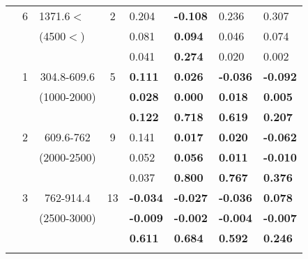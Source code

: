 \begin{table}[p]
\begin{tabular}{ccccllll}
 \multicolumn{1}{c}{} &  \multicolumn{1}{c}{6} &  \multicolumn{1}{l}{1371.6$<$} &  \multicolumn{1}{c}{2} & 0.204 & \textbf{-0.108 } & 0.236  & 0.307  \\ 
 \multicolumn{1}{c}{} &  \multicolumn{1}{c}{} &  \multicolumn{1}{l}{(4500$<$)} &  \multicolumn{1}{c}{} & 0.081 &  \textbf{0.094 } & 0.046  & 0.074  \\ 
 \multicolumn{1}{c}{} &  \multicolumn{1}{c}{} &  \multicolumn{1}{c}{} &  \multicolumn{1}{c}{} & 0.041 & \textbf{0.274 } & 0.020  & 0.002  \\ \hline\noalign{\smallskip}
 \multicolumn{1}{c}{2009-2012} &  \multicolumn{1}{c}{1} &  \multicolumn{1}{p{2cm}}{304.8-609.6} &  \multicolumn{1}{c}{5} & \textbf{0.111} &  \textbf{0.026 } & \textbf{-0.036 } & \textbf{-0.092 }  \\ 
  \multicolumn{1}{c}{} &  \multicolumn{1}{c}{} &  \multicolumn{1}{p{2cm}}{ (1000-2000)} &  \multicolumn{1}{c}{} & \textbf{0.028} & \textbf{0.000 } & \textbf{0.018 } & \textbf{0.005 }  \\ 
 \multicolumn{1}{c}{} &  \multicolumn{1}{c}{} &  \multicolumn{1}{c}{} &  \multicolumn{1}{c}{} & \textbf{0.122} & \textbf{0.718 } & \textbf{0.619 } & \textbf{0.207 }  \\ \cline{5-8}\noalign{\smallskip}
 \multicolumn{1}{c}{} &  \multicolumn{1}{c}{2} &  \multicolumn{1}{p{2cm}}{609.6-762} &  \multicolumn{1}{c}{9} & 0.141 & \textbf{0.017 } & \textbf{0.020 } & \textbf{-0.062 }  \\ 
 \multicolumn{1}{c}{} &  \multicolumn{1}{c}{} &  \multicolumn{1}{p{2cm}}{(2000-2500)} &  \multicolumn{1}{c}{} & 0.052 & \textbf{0.056 } & \textbf{0.011 } & \textbf{-0.010 }  \\ 
 \multicolumn{1}{c}{} &  \multicolumn{1}{c}{} &  \multicolumn{1}{c}{} &  \multicolumn{1}{c}{} & 0.037 & \textbf{0.800 } & \textbf{0.767 } & \textbf{0.376 }  \\ \cline{5-8}\noalign{\smallskip}
 \multicolumn{1}{c}{} &  \multicolumn{1}{c}{3} &  \multicolumn{1}{p{2cm}}{762-914.4} &  \multicolumn{1}{c}{13} & \textbf{-0.034 }&  \textbf{-0.027 } & \textbf{-0.036 } & \textbf{0.078 }  \\ 
 \multicolumn{1}{c}{} &  \multicolumn{1}{c}{} &  \multicolumn{1}{p{2cm}}{(2500-3000)} &  \multicolumn{1}{c}{} &\textbf{-0.009}&\textbf{-0.002 } & \textbf{-0.004 } & \textbf{-0.007 }  \\ 
 \multicolumn{1}{c}{} &  \multicolumn{1}{c}{} &  \multicolumn{1}{c}{} &  \multicolumn{1}{c}{} &\textbf{0.611}&\textbf{0.684 } & \textbf{0.592 } & \textbf{0.246 }  \\ \cline{5-8}\noalign{\smallskip}

\end{tabular}
\end{table}
